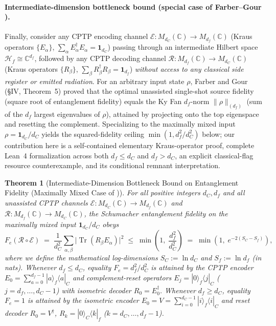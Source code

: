 \documentclass[11pt,a4paper]{article}
\newtheorem{theorem}{Theorem}
\theoremstyle{definition}
\theoremstyle{remark}
\newcommand{\Tr}{\operatorname{Tr}}
\newcommand{\cH}{\mathcal{H}}
\newcommand{\cE}{\mathcal{E}}
\newcommand{\cR}{\mathcal{R}}
\newcommand{\bbC}{\mathbb{C}}
\newcommand{\1}{\mathbf{1}}
\begin{document}
\paragraph{Intermediate-dimension bottleneck bound (special case of Farber--Gour \cite{FarberGour2026}).}
Finally, consider any CPTP encoding channel $\cE: M_{d_C}(\bbC) \to M_{d_f}(\bbC)$ (Kraus operators $\{E_\alpha\}$, $\sum_\alpha E_\alpha^\dagger E_\alpha = \1_{d_C}$) passing through an intermediate Hilbert space $\cH_f \cong \bbC^{d_f}$, followed by any CPTP decoding channel $\cR: M_{d_f}(\bbC) \to M_{d_C}(\bbC)$ (Kraus operators $\{R_\beta\}$, $\sum_\beta R_\beta^\dagger R_\beta = \1_{d_f}$) \emph{without access to any classical side register or emitted radiation}. For an arbitrary input state $\rho$, Farber and Gour \cite{FarberGour2026} (\S IV, Theorem~5) proved that the optimal unassisted single-shot source fidelity (square root of entanglement fidelity) equals the Ky Fan $d_f$-norm $\|\rho\|_{(d_f)}$ (sum of the $d_f$ largest eigenvalues of $\rho$), attained by projecting onto the top eigenspace and resetting the complement. Specializing to the maximally mixed input $\rho = \1_{d_C}/d_C$ yields the squared-fidelity ceiling $\min(1, d_f^2/d_C^2)$ below; our contribution here is a self-contained elementary Kraus-operator proof, complete Lean~4 formalization across both $d_f\le d_C$ and $d_f > d_C$, an explicit classical-flag resource counterexample, and its conditional remnant interpretation.

\begin{theorem}[Intermediate-Dimension Bottleneck Bound on Entanglement Fidelity (Maximally Mixed Case of \cite{FarberGour2026})]\label{thm:bottleneck}
For all positive integers $d_C, d_f$ and all unassisted CPTP channels $\cE: M_{d_C}(\bbC) \to M_{d_f}(\bbC)$ and $\cR: M_{d_f}(\bbC) \to M_{d_C}(\bbC)$, the Schumacher entanglement fidelity \cite{Schumacher1996} on the maximally mixed input $\1_{d_C}/d_C$ obeys
\begin{equation}\label{eq:bottleneck}
  F_e(\cR \circ \cE) \;=\; \frac{1}{d_C^2}\sum_{\alpha,\beta}\bigl|\Tr(R_\beta E_\alpha)\bigr|^2 \;\le\; \min\!\left(1,\;\frac{d_f^2}{d_C^2}\right) \;=\; \min\!\left(1,\; e^{-2(S_C - S_f)}\right),
\end{equation}
where we define the mathematical log-dimensions $S_C := \ln d_C$ and $S_f := \ln d_f$ (in nats). Whenever $d_f \le d_C$, equality $F_e = d_f^2/d_C^2$ is attained by the CPTP encoder $E_0 = \sum_{a=0}^{d_f-1} |a\rangle_f\langle a|_C$ and complement-reset operators $E_j = |0\rangle_f\langle j|_C$ ($j = d_f,\dots,d_C-1$) with isometric decoder $R_0 = E_0^\dagger$. Whenever $d_f \ge d_C$, equality $F_e = 1$ is attained by the isometric encoder $E_0 = V = \sum_{i=0}^{d_C-1}|i\rangle_f\langle i|_C$ and reset decoder $R_0 = V^\dagger$, $R_k = |0\rangle_C\langle k|_f$ ($k = d_C,\dots,d_f-1$).
\end{theorem}
\end{document}
